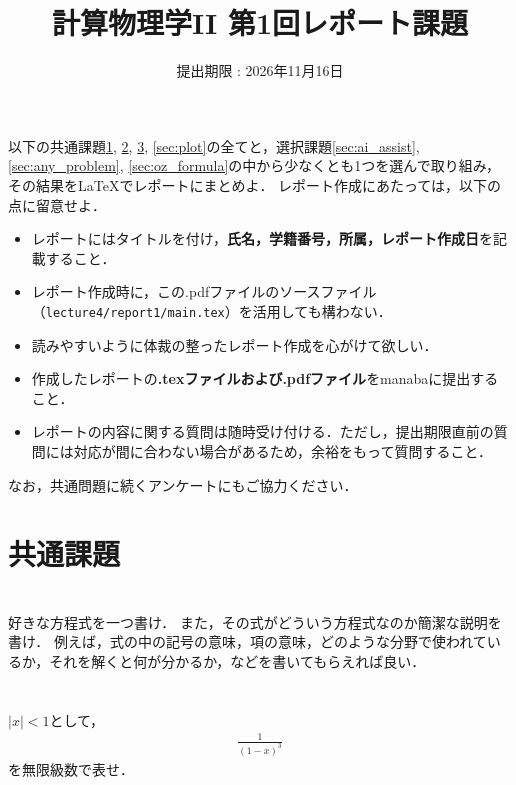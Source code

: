 \documentclass[a4paper,12pt]{jsarticle}
\title{計算物理学II 第1回レポート課題}
\date{提出期限 : 2026年11月16日}
\begin{document}
\maketitle

以下の共通課題\ref{sec:equation}, \ref{sec:power_series}, \ref{sec:evp}, \ref{sec:plot}の全てと，選択課題\ref{sec:ai_assist}, \ref{sec:any_problem}, \ref{sec:oz_formula}の中から少なくとも1つを選んで取り組み，その結果を\LaTeX でレポートにまとめよ．
レポート作成にあたっては，以下の点に留意せよ．
\begin{itemize}
    \item レポートにはタイトルを付け，{\bf 氏名，学籍番号，所属，レポート作成日}を記載すること．
    \item レポート作成時に，この.pdfファイルのソースファイル（\texttt{lecture4/report1/main.tex}）を活用しても構わない．
    \item 読みやすいように体裁の整ったレポート作成を心がけて欲しい．
    \item 作成したレポートの{\bf .texファイルおよび.pdfファイル}をmanabaに提出すること．
    \item レポートの内容に関する質問は随時受け付ける．ただし，提出期限直前の質問には対応が間に合わない場合があるため，余裕をもって質問すること．
\end{itemize}

なお，共通問題に続くアンケートにもご協力ください．

\section*{共通課題}

\section{}
\label{sec:equation}

好きな方程式を一つ書け．
また，その式がどういう方程式なのか簡潔な説明を書け．
例えば，式の中の記号の意味，項の意味，どのような分野で使われているか，それを解くと何が分かるか，などを書いてもらえれば良い．

\section{}
\label{sec:power_series}
$|x|<1$として，
\begin{align*}
    \frac{1}{(1-x)^{3}}
\end{align*}
を無限級数で表せ．

\section{}
\label{sec:evp}
\end{document}

